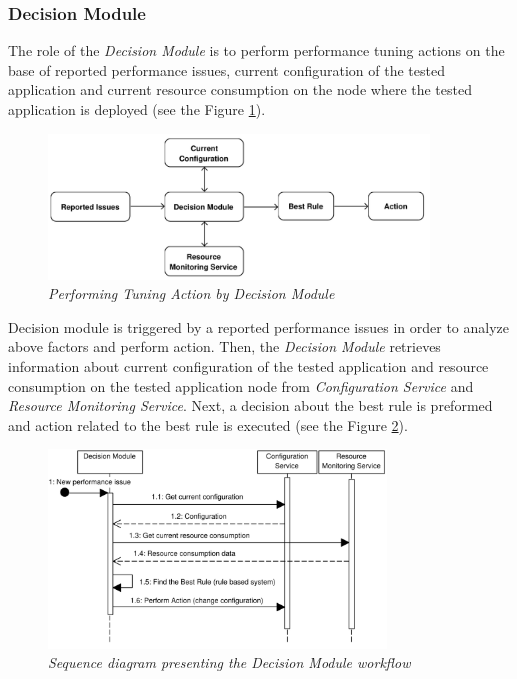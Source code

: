 \documentclass[10pt,a4paper]{article}
\begin{document}
\subsubsection{Decision Module} \label{dm}

The role of the \textit{Decision Module} is to perform performance tuning actions on the base of reported performance issues, current configuration of the tested application and current resource consumption on the node where the tested application is deployed (see the Figure \ref{decisionmodule}). 

\begin{figure}[!htb]
\centering
\includegraphics[width=0.9\textwidth]{DecisionModuleDiagram}
\caption{\textit{Performing Tuning Action by Decision Module}} \label{decisionmodule}
\end{figure}

Decision module is triggered by a reported performance issues in order to analyze above factors and perform action. Then, the \textit{Decision Module} retrieves information about current configuration of the tested application and resource consumption on the tested application node from \textit{Configuration Service} and \textit{Resource Monitoring Service}. Next, a decision about the best rule is preformed and action related to the best rule is executed (see the Figure \ref{dmsequence}). 

\begin{figure}[!htb]
\centering
\includegraphics[width=0.8\textwidth]{DecisionModuleSequenceDiagram}
\caption{\textit{Sequence diagram presenting the Decision Module workflow}} \label{dmsequence}
\end{figure}
\end{document}
